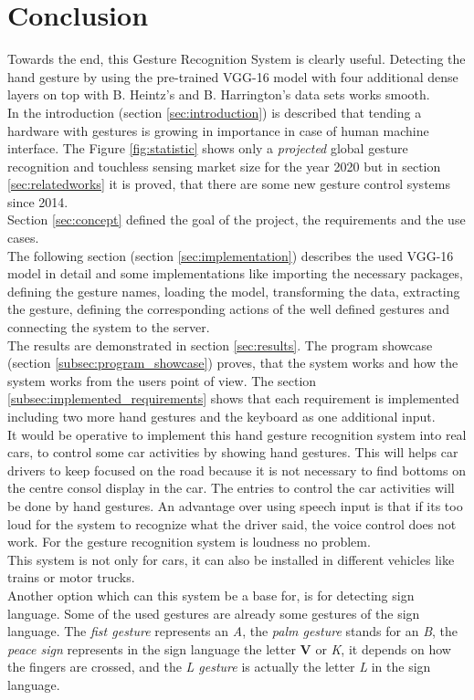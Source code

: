 \section{Conclusion}
\label{sec:conclusion}
Towards the end, this Gesture Recognition System is clearly useful. Detecting the hand gesture by using the pre-trained VGG-16 model with four additional dense layers on top with B. Heintz's and B. Harrington's data sets works smooth.\\
In the introduction (section \ref{sec:introduction}) is described that tending a hardware with gestures is growing in importance in case of human machine interface. The Figure \ref{fig:statistic} shows only a \textit{projected} global gesture recognition and touchless sensing market size for the year 2020 but in section \ref{sec:relatedworks} it is proved, that there are some new gesture control systems since 2014.\\ Section \ref{sec:concept} defined the goal of the project, the requirements and the use cases.\\
The following section (section \ref{sec:implementation}) describes the used VGG-16 model in detail and some implementations like importing the necessary packages, defining the gesture names, loading the model, transforming the data, extracting the gesture, defining the corresponding actions of the well defined gestures and connecting the system to the server.\\
The results are demonstrated in section \ref{sec:results}. The program showcase (section \ref{subsec:program_showcase}) proves, that the system works and how the system works from the users point of view. The section \ref{subsec:implemented_requirements} shows that each requirement is implemented including two more hand gestures and the keyboard as one additional input.\\
It would be operative to implement this hand gesture recognition system into real cars, to control some car activities by showing hand gestures. This will helps car drivers to keep focused on the road because it is not necessary to find bottoms on the centre consol display in the car. The entries to control the car activities will be done by hand gestures. An advantage over using speech input is that if its too loud for the system to recognize what the driver said, the voice control does not work. For the gesture recognition system is loudness no problem.\\
This system is not only for cars, it can also be installed in different vehicles like trains or motor trucks.\\
Another option which can this system be a base for, is for detecting 	sign language. Some of the used gestures are already some gestures of the sign language. The \textit{fist gesture} represents an \textit{A}, the \textit{palm gesture} stands for an \textit{B}, the \textit{peace sign} represents in the sign language the letter \textbf{V} or \textit{K}, it depends on how the fingers are crossed, and the \textit{L gesture} is actually the letter \textit{L} in the sign language.\\

\newpage


